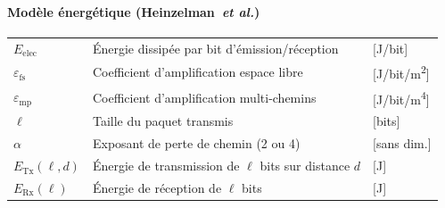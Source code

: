 \paragraph{Modèle énergétique (Heinzelman~\emph{et al.})}
\begin{longtable}{lp{3in}l}
$E_{\text{elec}}$ & Énergie dissipée par bit d'émission/réception & [J/bit] \\
$\varepsilon_{\text{fs}}$ & Coefficient d'amplification espace libre & [J/bit/m\textsuperscript{2}] \\
$\varepsilon_{\text{mp}}$ & Coefficient d'amplification multi-chemins & [J/bit/m\textsuperscript{4}] \\
$\ell$ & Taille du paquet transmis & [bits] \\
$\alpha$ & Exposant de perte de chemin (2 ou 4) & [sans dim.] \\
$E_{\text{Tx}}(\ell, d)$ & Énergie de transmission de $\ell$ bits sur distance $d$ & [J] \\
$E_{\text{Rx}}(\ell)$ & Énergie de réception de $\ell$ bits & [J] \\
\end{longtable}


